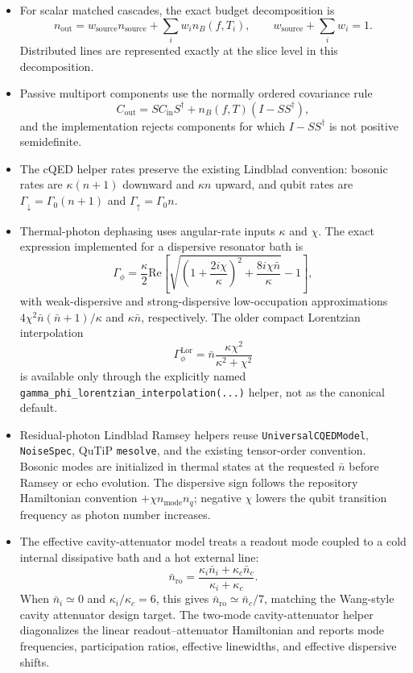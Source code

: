 \documentclass[11pt]{article}
\begin{document}
\begin{itemize}[leftmargin=1.5em]
\[  \]
  implemented by midpoint slices with
  \[
  \eta_i=\exp(-\alpha_i dz),\qquad
  \alpha_{\mathrm{Np/m}}=\frac{\ln 10}{10}\alpha_{\mathrm{dB/m}}.
  \]
  \item For scalar matched cascades, the exact budget decomposition is
  \[
  n_{\mathrm{out}} = w_{\mathrm{source}}n_{\mathrm{source}}
  + \sum_i w_i n_B(f,T_i),
  \qquad
  w_{\mathrm{source}} + \sum_i w_i = 1.
  \]
  Distributed lines are represented exactly at the slice level in this
  decomposition.
  \item Passive multiport components use the normally ordered covariance rule
  \[
  C_{\mathrm{out}} = S C_{\mathrm{in}} S^\dagger
  + n_B(f,T)\left(I-S S^\dagger\right),
  \]
  and the implementation rejects components for which \(I-S S^\dagger\) is
  not positive semidefinite.
  \item The cQED helper rates preserve the existing Lindblad convention:
  bosonic rates are \(\kappa(n+1)\) downward and \(\kappa n\) upward, and qubit
  rates are \(\Gamma_\downarrow=\Gamma_0(n+1)\) and
  \(\Gamma_\uparrow=\Gamma_0 n\).
  \item Thermal-photon dephasing uses angular-rate inputs \(\kappa\) and
  \(\chi\). The exact expression implemented for a dispersive resonator bath is
  \[
  \Gamma_\phi =
  \frac{\kappa}{2}\mathrm{Re}\left[
  \sqrt{\left(1+\frac{2 i\chi}{\kappa}\right)^2
  +\frac{8 i\chi \bar{n}}{\kappa}}-1\right],
  \]
  with weak-dispersive and strong-dispersive low-occupation approximations
  \(4\chi^2\bar{n}(\bar{n}+1)/\kappa\) and \(\kappa\bar{n}\), respectively.
  The older compact Lorentzian interpolation
  \[
  \Gamma_\phi^{\mathrm{Lor}}=
  \bar{n}\frac{\kappa\chi^2}{\kappa^2+\chi^2}
  \]
  is available only through the explicitly named
  \texttt{gamma\_phi\_lorentzian\_interpolation(...)} helper, not as the
  canonical default.
  \item Residual-photon Lindblad Ramsey helpers reuse
  \texttt{UniversalCQEDModel}, \texttt{NoiseSpec}, QuTiP \texttt{mesolve}, and
  the existing tensor-order convention. Bosonic modes are initialized in
  thermal states at the requested \(\bar{n}\) before Ramsey or echo evolution.
  The dispersive sign follows the repository Hamiltonian convention
  \(+\chi n_{\mathrm{mode}}n_q\); negative \(\chi\) lowers the qubit transition
  frequency as photon number increases.
  \item The effective cavity-attenuator model treats a readout mode coupled to
  a cold internal dissipative bath and a hot external line:
  \[
  \bar{n}_{\mathrm{ro}}=
  \frac{\kappa_i\bar{n}_i+\kappa_c\bar{n}_c}{\kappa_i+\kappa_c}.
  \]
  When \(\bar{n}_i\simeq0\) and \(\kappa_i/\kappa_c=6\), this gives
  \(\bar{n}_{\mathrm{ro}}\simeq\bar{n}_c/7\), matching the Wang-style cavity
  attenuator design target. The two-mode cavity-attenuator helper diagonalizes
  the linear readout--attenuator Hamiltonian and reports mode frequencies,
  participation ratios, effective linewidths, and effective dispersive shifts.
\end{itemize}
\end{document}
